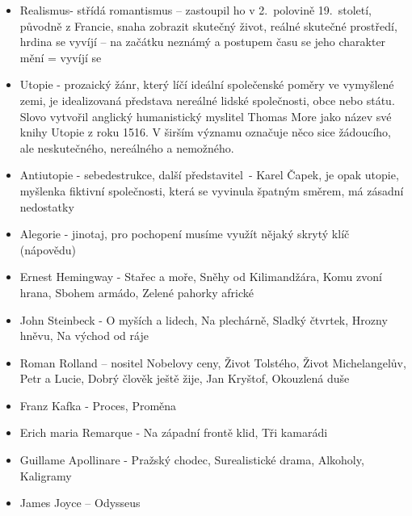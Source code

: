 \documentclass{article}
\begin{document}
\begin{itemize}
    \item Realismus- střídá romantismus – zastoupil ho v 2.~polovině 19.~století, původně z Francie, snaha 
    zobrazit skutečný život, reálné skutečné prostředí, hrdina se vyvíjí – na začátku neznámý a postupem času 
    se jeho charakter mění = vyvíjí se
    
    \item Utopie - prozaický žánr, který líčí ideální společenské poměry ve vymyšlené zemi, je idealizovaná 
    představa nereálné lidské společnosti, obce nebo státu. Slovo vytvořil anglický humanistický myslitel 
    Thomas More jako název své knihy Utopie z roku 1516. V širším významu označuje něco sice žádoucího, ale 
    neskutečného, nereálného a nemožného.
    
    \item Antiutopie - sebedestrukce, další představitel \,- Karel Čapek, je opak utopie, myšlenka fiktivní 
    společnosti, která se vyvinula špatným směrem, má zásadní nedostatky
    
    \item Alegorie - jinotaj, pro pochopení musíme využít nějaký skrytý klíč (nápovědu)
    \item Ernest Hemingway - Stařec a moře, Sněhy od Kilimandžára, Komu zvoní hrana, Sbohem armádo, Zelené 
    pahorky africké			
    
    \item John Steinbeck - O myších a lidech, Na plechárně, Sladký čtvrtek, Hrozny hněvu, Na východ od ráje
    \item Roman Rolland – nositel Nobelovy ceny, Život Tolstého, Život Michelangelův, Petr a Lucie, Dobrý 
    člověk ještě žije, Jan Kryštof, Okouzlená duše
    
    \item Franz Kafka - Proces, Proměna
    \item Erich maria Remarque - Na západní frontě klid, Tři kamarádi
    \item Guillame Apollinare - Pražský chodec, Surealistické drama, Alkoholy, Kaligramy
    \item James Joyce – Odysseus
\end{itemize}
\end{document}
